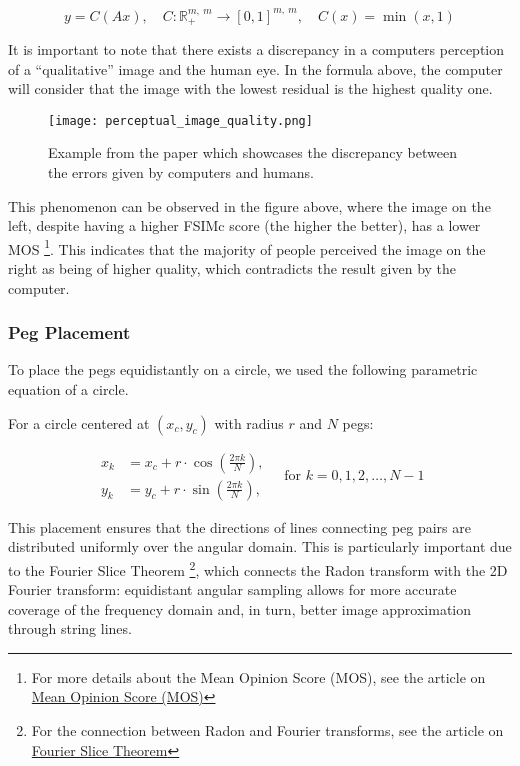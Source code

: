 \begin{equation}
y = C(Ax), \quad
C : \mathbb{R}_+^{m, \ m} \rightarrow [0, 1]^{m, \ m}, \quad
C(x) = \min(x, 1)
\label{clamping_operator}
\end{equation}

It is important to note that there exists a discrepancy in a computers perception of a \enquote{qualitative} image and the human eye. In the formula above, the computer will consider that the image with the lowest residual is the highest quality one.

\begin{figure}[H]
    \centering
    \texttt{[image: perceptual\_image\_quality.png]}
    \caption{Example from the paper \cite{perceptual_image_quality} which showcases the discrepancy between the errors given by computers and humans.}
    \label{fig:perceptual_image_quality}
\end{figure}

This phenomenon can be observed in the figure above, where the image on the left, despite having a higher FSIMc score \cite{fsimc} (the higher the better), has a lower MOS \footnote{For more details about the Mean Opinion Score (MOS), see the article on \href{https://en.wikipedia.org/wiki/Mean_opinion_score}{Mean Opinion Score (MOS)}}. This indicates that the majority of people perceived the image on the right as being of higher quality, which contradicts the result given by the computer.

\subsubsection{Peg Placement}

To place the pegs equidistantly on a circle, we used the following parametric equation of a circle.

For a circle centered at \((x_c, y_c)\) with radius \(r\) and \(N\) pegs:

\[
\begin{aligned}
x_k &= x_c + r \cdot \cos\left( \frac{2\pi k}{N} \right), \\
y_k &= y_c + r \cdot \sin\left( \frac{2\pi k}{N} \right),
\end{aligned}
\quad \text{for } k = 0, 1, 2, \dots, N - 1
\]

This placement ensures that the directions of lines connecting peg pairs are distributed uniformly over the angular domain. This is particularly important due to the Fourier Slice Theorem \footnote{For the connection between Radon and Fourier transforms, see the article on \href{https://en.wikipedia.org/wiki/Projection-slice_theorem}{Fourier Slice Theorem}}, which connects the Radon transform with the 2D Fourier transform: equidistant angular sampling allows for more accurate coverage of the frequency domain and, in turn, better image approximation through string lines.

